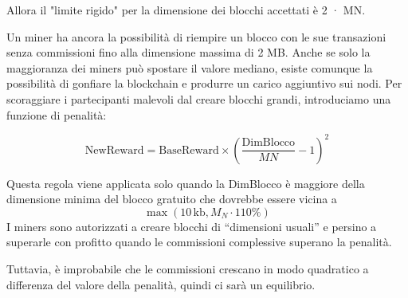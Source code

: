 Allora il "limite rigido" per la dimensione dei blocchi accettati è 2 ·
MN.

Un miner ha ancora la possibilità di riempire un blocco con le sue
transazioni senza commissioni fino alla dimensione massima di 2 MB.
Anche se solo la maggioranza dei miners può spostare il valore mediano,
esiste comunque la possibilità di gonfiare la blockchain e produrre un
carico aggiuntivo sui nodi. Per scoraggiare i partecipanti malevoli dal
creare blocchi grandi, introduciamo una funzione di penalità:

\[
\text{NewReward} = \text{BaseReward} \times \left( \frac{\text{DimBlocco}}{MN} - 1 \right)^2
\]

Questa regola viene applicata solo quando la DimBlocco è maggiore della
dimensione minima del blocco gratuito che dovrebbe essere vicina a \[
\max(10\, \text{kb}, M_N \cdot 110\%) \] I miners sono autorizzati a
creare blocchi di ``dimensioni usuali'' e persino a superarle con
profitto quando le commissioni complessive superano la penalità.

Tuttavia, è improbabile che le commissioni crescano in modo quadratico a
differenza del valore della penalità, quindi ci sarà un equilibrio.